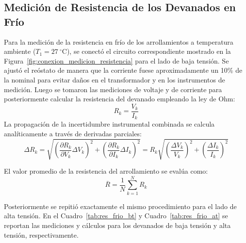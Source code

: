 \subsection{Medición de Resistencia de los Devanados en Frío}

Para la medición de la resistencia en frío de los arrollamientos a temperatura ambiente ($T_1 = 27~^{\circ}\mathrm{C}$), se conectó el circuito correspondiente mostrado en la Figura~\ref{fig:conexion_medicion_resistencia} para el lado de baja tensión. Se ajustó el reóstato de manera que la corriente fuese aproximadamente un 10\% de la nominal para evitar daños en el transformador y en los instrumentos de medición. Luego se tomaron las mediciones de voltaje y de corriente para posteriormente calcular la resistencia del devanado empleando la ley de Ohm:
\begin{equation}
    R_k = \frac{V_k}{I_k}
    \label{eq:ley_ohm}
\end{equation}
La propagación de la incertidumbre instrumental combinada se calcula analíticamente a través de derivadas parciales:
\begin{equation}
    \Delta R_k = \sqrt{\left(\frac{\partial R_k}{\partial V_k}\Delta V_k\right)^2 + \left(\frac{\partial R_k}{\partial I_k}\Delta I_k\right)^2} = R_k \sqrt{\left(\frac{\Delta V_k}{V_k}\right)^2 + \left(\frac{\Delta I_k}{I_k}\right)^2}
    \label{eq:prop_error_r}
\end{equation}

El valor promedio de la resistencia del arrollamiento se evalúa como:
\begin{equation}
    \overline{R} = \frac{1}{N}\sum_{k=1}^N R_k
    \label{eq:r_promedio}
\end{equation}

Posteriormente se repitió exactamente el mismo procedimiento para el lado de alta tensión. En el Cuadro~\ref{tab:res_frio_bt} y Cuadro~\ref{tab:res_frio_at} se reportan las mediciones y cálculos para los devanados de baja tensión y alta tensión, respectivamente.

